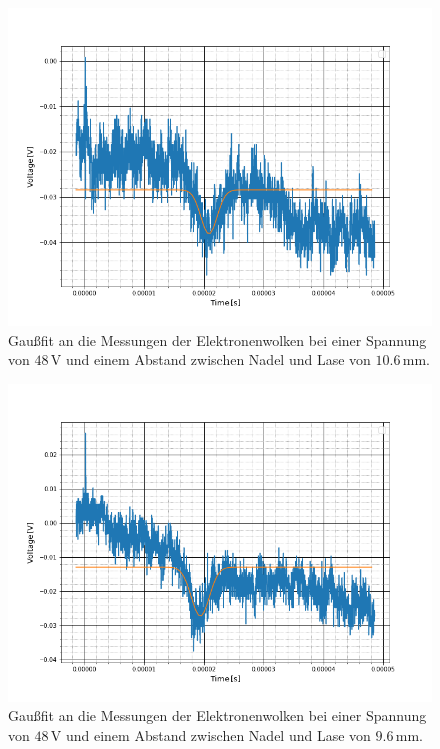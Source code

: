 \begin{figure}
	\includegraphics[scale=0.5]{Bild/S1}
	\centering
	\caption[Gaußfit an Messung bei Konst. Spannung 1]{Gaußfit an die Messungen der Elektronenwolken bei einer Spannung von $48\,$V und einem Abstand zwischen Nadel und Lase von $10.6$\,mm.}
\end{figure}
\begin{figure}
	\includegraphics[scale=0.5]{Bild/S2}
	\centering
	\caption[Gaußfit an Messung bei Konst. Spannung 2]{Gaußfit an die Messungen der Elektronenwolken bei einer Spannung von $48\,$V und einem Abstand zwischen Nadel und Lase von $9.6$\,mm.}
\end{figure}
